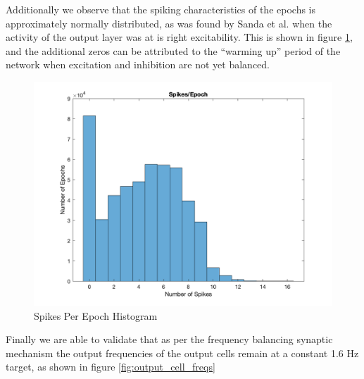 \documentclass[11pt, twocolumn]{article}
\begin{document}
Additionally we observe that the spiking characteristics of the epochs is approximately normally distributed, as was found by Sanda et al. \cite{sanda2017multi} when the activity of the output layer was at is right excitability. This is shown in figure \ref{fig:spikes_per_epoch}, and the additional zeros can be attributed to the ``warming up'' period of the network when excitation and inhibition are not yet balanced.

\begin{figure}[H]
	\centering
	\includegraphics[width=\linewidth]{spikes_per_epoch}
	\caption{Spikes Per Epoch Histogram}
	\label{fig:spikes_per_epoch}
\end{figure}

Finally we are able to validate that as per the frequency balancing synaptic mechanism the output frequencies of the output cells remain at a constant 1.6 Hz target, as shown in figure \ref{fig:output_cell_freqs}
\end{document}
